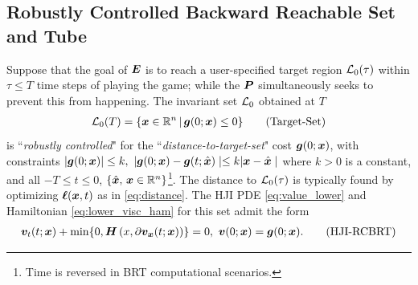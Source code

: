 \subsection{Robustly Controlled Backward Reachable Set and Tube}
Suppose that the goal of $\bm{E}$ is to reach a user-specified target region $\mathcal{L}_0(\tau)$ within $\tau\le T$ time steps of playing the game; %
while the  $\bm{P}$ simultaneously seeks to prevent this from happening. The invariant set $\mathcal{L}_0$ obtained at $T$
\begin{align}
\mathcal{L}_0(T) = \{ \bm{x} \in {\mathbb{R}}^n \,|\, \bm{g}(0; \bm{x}) \le 0 \}
\tag{Target-Set}
\label{eq:target_set}
\end{align}
%
is ``\textit{robustly controlled}" for the ``\textit{distance-to-target-set}" cost $\bm{g}(0; \bm{x})$, with constraints $| \bm{g}(0; \bm{x}) | \le k, \,\,
| \bm{g}(0; \bm{x}) - \bm{g}(t; \hat{\bm{x}}) \mid \le k | \bm{x} - \hat{\bm{x}} \mid$
%
where $k>0$ is a  constant, and  all  $-T \le t \le 0$, $\{\hat{\bm{x}}, \, \bm{x} \in \mathbb{R}^n\}$\footnote{Time is reversed in BRT computational scenarios.}. The distance to $\mathcal{L}_0(\tau)$ is typically found by optimizing $\bm{\ell}(\bm{x}, t)$ as in \eqref{eq:distance}. %
%
The HJI  PDE \eqref{eq:value_lower} and Hamiltonian \eqref{eq:lower_visc_ham} for this set admit the form
%
\begin{align}
\bm{v}_t(t; \bm{x}) + \min\{0, \bm{H}\left(x, \partial \bm{v}_{\bm{x}}(t; \bm{x})\right)\} = 0, \,\,
\bm{v}(0; \bm{x}) = \bm{g}(0; \bm{x}).
\tag{HJI-RCBRT}
\label{eq:HJ-RCBRT}
\end{align}  %
%

